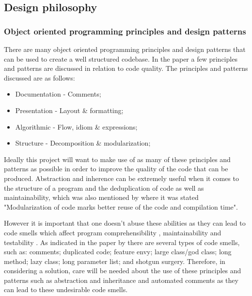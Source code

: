 \subsection{Design philosophy}

\subsubsection{Object oriented programming principles and design patterns}
There are many object oriented programming principles and design patterns that can be used to create a well structured codebase. In the paper \cite{10.1145/3428029.3428047} a few principles and patterns are discussed in relation to code quality. The principles and patterns discussed are as follows:
\begin{itemize}
	\item Documentation - Comments;
	\item Presentation - Layout \& formatting;
	\item Algorithmic - Flow, idiom \& expressions;
	\item Structure - Decomposition \& modularization;
\end{itemize}

Ideally this project will want to make use of as many of these principles and patterns as possible in order to improve the quality of the code that can be produced. Abstraction and inherence can be extremely useful when it comes to the structure of a program and the deduplication of code as well as maintainability, which was also mentioned by \cite{8681007} where it was stated "Modularization of code marks better reuse of the code and compilation time".

However it is important that one doesn't abuse these abilities as they can lead to code smells which affect program comprehensibility \citep{8681007, ImpactOfAntipatterns}, maintainability \citep{8681007, ImpactOfAntipatterns2, CodeSmellsAndMaintainability} and testability \citep{8681007, TestCasesAndCodeQuality}. As indicated in the paper by \cite{10.1145/3555228.3555268} there are several types of code smells, such as: comments; duplicated code; feature envy; large class/god class; long method; lazy class; long parameter list; and shotgun surgery. Therefore, in considering a solution, care will be needed about the use of these principles and patterns such as abstraction and inheritance and automated comments as they can lead to these undesirable code smells.

